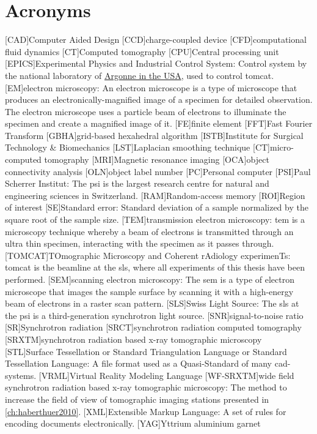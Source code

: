     \chapter*{Acronyms}
	\begin{acronym}[WF-SRXTM]
		[CAD]{Computer Aided Design}
		[CCD]{charge-coupled device}
		[CFD]{computational fluid dynamics}
		[CT]{Computed tomography}
		[CPU]{Central processing unit}
		[EPICS]{Experimental Physics and Industrial Control System}: Control system by the national laboratory of \href{http://www.aps.anl.gov/epics/}{Argonne in the USA}, used to control \acs{tomcat}.
		[EM]{electron microscopy}: An electron microscope is a type of microscope that produces an electronically-magnified image of a specimen for detailed observation. The electron microscope uses a particle beam of electrons to illuminate the specimen and create a magnified image of it.
		[FE]{finite element}
		[FFT]{Fast Fourier Transform}
		{grid-based hexahedral algorithm}
		{Institute for Surgical Technology \& Biomechanics}
		[LST]{Laplacian smoothing technique}
		[\micro CT]{micro-computed tomography}
		[MRI]{Magnetic resonance imaging}
		[OCA]{object connectivity analysis}
		[OLN]{object label number}
		[PC]{Personal computer}
		[PSI]{Paul Scherrer Institut}: The \acs{psi} is the largest research centre for natural and engineering sciences in Switzerland.
		[RAM]{Random-access memory}
		[ROI]{Region of interest}
		[SE]{Standard error}: Standard deviation of a sample normalized by the square root of the sample size.
		[TEM]{transmission electron microscopy}: \ac{tem} is a microscopy  technique whereby a beam of electrons is transmitted through an ultra thin specimen, interacting with the specimen as it passes through.
		[TOMCAT]{TOmographic Microscopy and Coherent rAdiology experimenTs}: \acs{tomcat} is the beamline at the \acs{sls}, where all experiments of this thesis have been performed.
		[SEM]{scanning electron microscopy}: The \ac{sem} is a type of electron microscope that images the sample surface by scanning it with a high-energy beam of electrons in a raster scan pattern.
		[SLS]{Swiss Light Source}: The \acs{sls} at the \acs{psi} is a third-generation synchrotron light source.
		[SNR]{signal-to-noise ratio}
		[SR]{Synchrotron radiation}
		{synchrotron radiation computed tomography}
		[SRXTM]{synchrotron radiation based x-ray tomographic microscopy}
		[STL]{Surface Tessellation or Standard Triangulation Language or Standard Tessellation Language}: A file format used as a Quasi-Standard of many \acs{cad}-systems.
		{Virtual Reality Modeling Language}
		[WF-SRXTM]{wide field synchrotron radiation based x-ray tomographic microscopy}: The method to increase the field of view of tomographic imaging stations presented in \autoref{ch:haberthuer2010}.
		[XML]{Extensible Markup Language}: A set of rules for encoding documents electronically.
		[YAG]{Yttrium aluminium garnet}
	\end{acronym}
\endgroup

\cleardoublepage